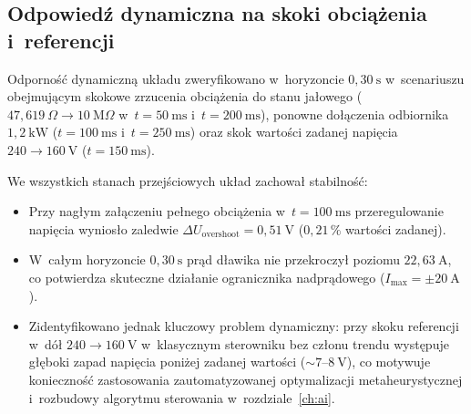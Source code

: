 \subsection{Odpowiedź dynamiczna na skoki obciążenia i~referencji}
\label{subsec:transient}

Odporność dynamiczną układu zweryfikowano w~horyzoncie $0{,}30~\mathrm{s}$ w~scenariuszu obejmującym skokowe zrzucenia obciążenia do stanu jałowego ($47{,}619~\Omega \to 10~\mathrm{M}\Omega$ w~$t=50~\mathrm{ms}$ i~$t=200~\mathrm{ms}$), ponowne dołączenia odbiornika $1{,}2~\mathrm{kW}$ ($t=100~\mathrm{ms}$ i~$t=250~\mathrm{ms}$) oraz skok wartości zadanej napięcia $240 \to 160~\mathrm{V}$ ($t=150~\mathrm{ms}$).

We wszystkich stanach przejściowych układ zachował stabilność:
\begin{itemize}
    \item Przy nagłym załączeniu pełnego obciążenia w~$t=100~\mathrm{ms}$ przeregulowanie napięcia wyniosło zaledwie $\Delta U_{\mathrm{overshoot}} = 0{,}51~\mathrm{V}$ ($0{,}21\,\%$ wartości zadanej).
    \item W~całym horyzoncie $0{,}30~\mathrm{s}$ prąd dławika nie przekroczył poziomu $22{,}63~\mathrm{A}$, co potwierdza skuteczne działanie ogranicznika nadprądowego ($I_{\max} = \pm 20~\mathrm{A}$).
    \item Zidentyfikowano jednak kluczowy problem dynamiczny: przy skoku referencji w~dół $240 \to 160~\mathrm{V}$ w~klasycznym sterowniku bez członu trendu występuje głęboki zapad napięcia poniżej zadanej wartości ($\sim 7$--$8~\mathrm{V}$), co motywuje konieczność zastosowania zautomatyzowanej optymalizacji metaheurystycznej i~rozbudowy algorytmu sterowania w~rozdziale~\ref{ch:ai}.
\end{itemize}
